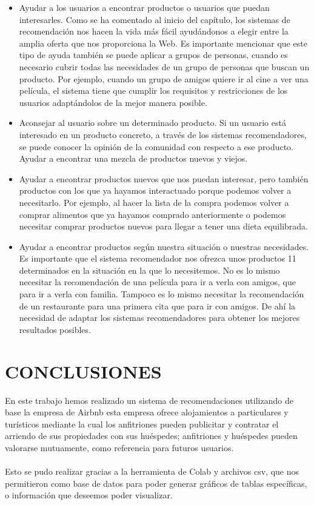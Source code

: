 \documentclass[11pt,a4paper]{article}
\begin{document}
		\begin{itemize}
			\item Ayudar a los usuarios a encontrar productos o usuarios que puedan interesarles. Como se ha comentado al inicio del capítulo, los sistemas de recomendación nos hacen la vida más fácil ayudándonos a elegir entre la amplia oferta que nos proporciona la Web. Es importante mencionar que este tipo de ayuda también se puede aplicar a grupos de personas, cuando es necesario cubrir todas las necesidades de un grupo de personas que buscan un producto. Por ejemplo, cuando un grupo de amigos quiere ir al cine a ver una película, el sistema tiene que cumplir los requisitos y restricciones de los usuarios adaptándolos de la mejor manera posible.
			
			\item Aconsejar al usuario sobre un determinado producto. Si un usuario está interesado en un producto concreto, a través de los sistemas recomendadores, se puede conocer la opinión de la comunidad con respecto a ese producto. Ayudar a encontrar una mezcla de productos nuevos y viejos.
			
			\item Ayudar a encontrar productos nuevos que nos puedan interesar, pero también productos con los que ya hayamos interactuado porque podemos volver a necesitarlo. Por ejemplo, al hacer la lista de la compra podemos volver a comprar alimentos que ya hayamos comprado anteriormente o podemos necesitar comprar productos nuevos para llegar a tener una dieta equilibrada.   
			
			\item Ayudar a encontrar productos según nuestra situación o nuestras necesidades. Es importante que el sistema recomendador nos ofrezca unos productos 11 determinados en la situación en la que lo necesitemos. No es lo mismo necesitar la recomendación de una película para ir a verla con amigos, que para ir a verla con familia. Tampoco es lo mismo necesitar la recomendación de un restaurante para una primera cita que para ir con amigos. De ahí la necesidad de adaptar los sistemas recomendadores para obtener los mejores resultados posibles.
		\end{itemize}
		
	 	
	 	\section{CONCLUSIONES}
	 	
	 	En este trabajo hemos realizado un sistema de recomendaciones utilizando de base la empresa de Airbnb esta empresa ofrece alojamientos a particulares y turísticos mediante la cual los anfitriones pueden publicitar y contratar el arriendo de sus propiedades con sus huéspedes; anfitriones y huéspedes pueden valorarse mutuamente, como referencia para futuros usuarios. \\
	 	\\
	 	Esto se pudo realizar gracias a la herramienta de Colab y archivos csv, que nos permitieron como base de datos para poder generar gráficos de tablas específicas, o información que deseemos poder visualizar.
	 	
	 	
	 	
	 	
	 		
\end{document}
